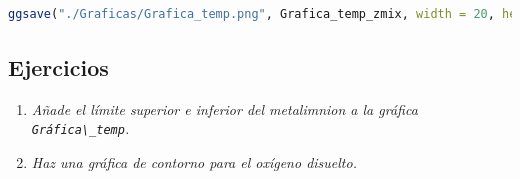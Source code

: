 \documentclass[
]{book}
\newcommand{\passthrough}[1]{#1}
\providecommand{\tightlist}{%
  \setlength{\itemsep}{0pt}\setlength{\parskip}{0pt}}
\begin{document}
\begin{lstlisting}[language=R]
ggsave("./Graficas/Grafica_temp.png", Grafica_temp_zmix, width = 20, height = 10, units = "cm")
\end{lstlisting}

\hypertarget{ejercicios-7}{%
\subsection{Ejercicios}\label{ejercicios-7}}

\begin{enumerate}
\def\labelenumi{\arabic{enumi}.}
\tightlist
\item
  \emph{Añade el límite superior e inferior del metalimnion a la gráfica \passthrough{\lstinline!Gráfica\_temp!}.}
\item
  \emph{Haz una gráfica de contorno para el oxígeno disuelto.}
\end{enumerate}

\backmatter

  
\end{document}
